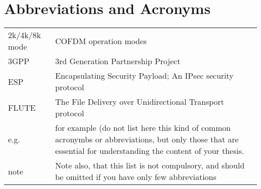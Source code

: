\chapter*{Abbreviations and Acronyms}


\noindent
\begin{longtable}{@{}p{}p{}@{}}
2k/4k/8k mode & COFDM operation modes \\
3GPP & 3rd Generation Partnership Project \\ 
ESP & Encapsulating Security Payload; An IPsec security protocol \\ 
FLUTE  & The File Delivery over Unidirectional Transport protocol \\ 
e.g.& for example (do not list here this kind of common acronymbs or abbreviations, but only those that are essential for understanding the content of your thesis. \\ 
note & Note also, that this list is not compulsory, and should be omitted if you have only few abbreviations

\end{longtable}
